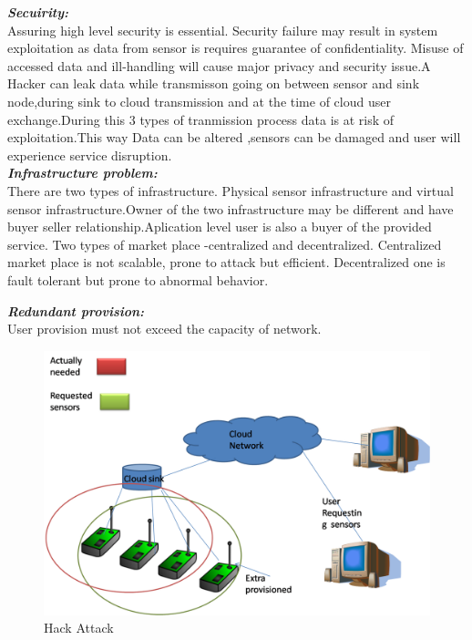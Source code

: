 \documentclass {report}
\begin{document}
{\bfseries \emph{Secuirity:}\\}Assuring high level security is essential. Security failure may result in system exploitation as data from sensor is requires guarantee of confidentiality. Misuse of accessed data and ill-handling will cause major privacy and security issue.A Hacker can leak data while transmisson going on between sensor and sink node,during sink to cloud transmission and at the time of cloud user exchange.During this 3 types of tranmission process data is at risk of exploitation.This way Data can be altered ,sensors can be damaged and user will experience service disruption.\\


{\bfseries \emph{Infrastructure problem:}\\}There are two types of infrastructure. Physical sensor infrastructure and virtual sensor infrastructure.Owner of the two infrastructure may be different and have buyer seller relationship.Aplication level user is also a buyer of the provided service. Two types of market place -centralized and decentralized. Centralized market place is not scalable, prone to attack but efficient. Decentralized one is fault tolerant but prone to abnormal behavior.

{\bfseries \emph{Redundant provision:}\\}
User provision must not exceed the capacity of network.

\begin{figure}
\begin{center}
\includegraphics [scale=0.5]{prov}
\caption{Hack Attack}
\end{center}
\end{figure}
\newpage
\end{document}

